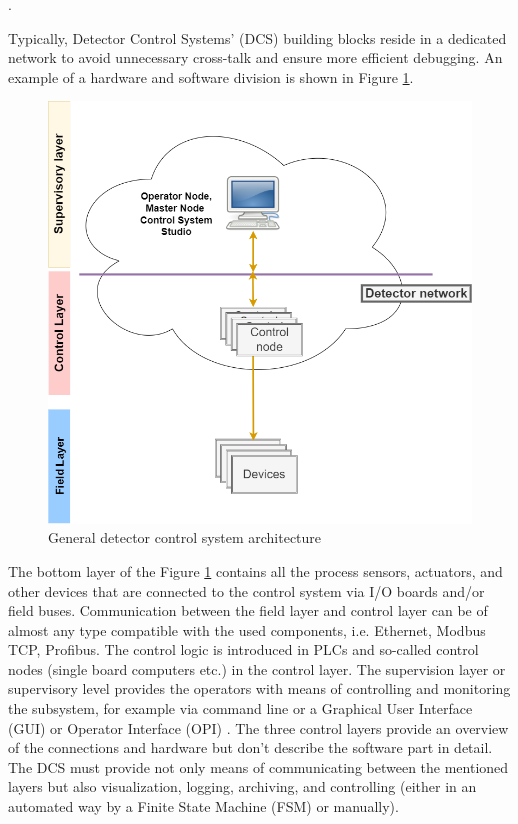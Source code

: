 
.%



 Typically, Detector Control Systems' (\gls{DCS}) building blocks reside in a dedicated network to avoid unnecessary cross-talk and ensure more efficient debugging. An example of a hardware and software division is shown in Figure \ref{fig_DCS_arch}.

 \begin{figure}[!h]
\centering
\includegraphics[width=0.5\columnwidth]{Chapter3/DCS/images/example.png}
\caption{General detector control system architecture}
\label{fig_DCS_arch}
\end{figure}

The bottom layer of the Figure \ref{fig_DCS_arch} contains all the process sensors, actuators, and other devices that are connected to the control system via I/O boards and/or field buses. Communication between the field layer and control layer can be of almost any type compatible with the used components, i.e. Ethernet, Modbus TCP, Profibus. The control logic is introduced in \gls{PLC}s and so-called control nodes (single board computers etc.) in the control layer. The supervision layer or supervisory level provides the operators with means of controlling and monitoring the subsystem, for example via command line or a Graphical User Interface (\gls{GUI}) or Operator Interface (\gls{OPI}) \cite{layers}. The three control layers provide an overview of the connections and hardware but don't describe the software part in detail. The \gls{DCS} must provide not only means of communicating between the mentioned layers but also visualization, logging, archiving, and controlling (either in an automated way by a Finite State Machine (\gls{FSM}) or manually). 
